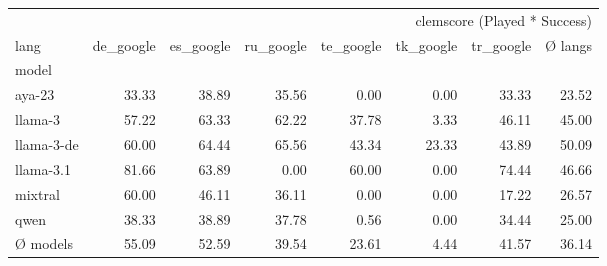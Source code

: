 \begin{tabular}{lrrrrrrr}
\toprule
 & \multicolumn{7}{r}{clemscore (Played * Success)} \\
lang & de_google & es_google & ru_google & te_google & tk_google & tr_google & Ø langs \\
model &  &  &  &  &  &  &  \\
\midrule
aya-23 & 33.33 & 38.89 & 35.56 & 0.00 & 0.00 & 33.33 & 23.52 \\
llama-3 & 57.22 & 63.33 & 62.22 & 37.78 & 3.33 & 46.11 & 45.00 \\
llama-3-de & 60.00 & 64.44 & 65.56 & 43.34 & 23.33 & 43.89 & 50.09 \\
llama-3.1 & 81.66 & 63.89 & 0.00 & 60.00 & 0.00 & 74.44 & 46.66 \\
mixtral & 60.00 & 46.11 & 36.11 & 0.00 & 0.00 & 17.22 & 26.57 \\
qwen & 38.33 & 38.89 & 37.78 & 0.56 & 0.00 & 34.44 & 25.00 \\
Ø models & 55.09 & 52.59 & 39.54 & 23.61 & 4.44 & 41.57 & 36.14 \\
\bottomrule
\end{tabular}
